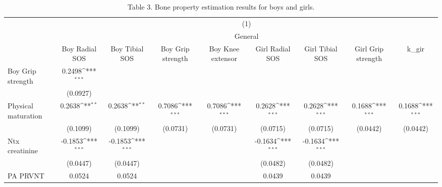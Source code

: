 \begin{table}[htbp]\centering
\def\sym#1{\ifmmode^{#1}\else\(^{#1}\)\fi}
\caption{Table 3. Bone property estimation results for boys and girls.}
\begin{tabular}{l*{8}{c}}
\hline\hline
                         &\multicolumn{8}{c}{(1)}                                                                                                                                        \\
                         &\multicolumn{8}{c}{General}                                                                                                                                    \\
                         &Boy Radial SOS         &Boy Tibial SOS         &Boy Grip strength         &Boy Knee extensor         &Girl Radial SOS         &Girl Tibial SOS         &Girl Grip strength         &     k\_gir         \\
\hline
Boy Grip strength        &    0.2498\sym{***}&                   &                   &                   &                   &                   &                   &                   \\
                         &  (0.0927)         &                   &                   &                   &                   &                   &                   &                   \\
[1em]
Physical maturation      &    0.2638\sym{**} &    0.2638\sym{**} &    0.7086\sym{***}&    0.7086\sym{***}&    0.2628\sym{***}&    0.2628\sym{***}&    0.1688\sym{***}&    0.1688\sym{***}\\
                         &  (0.1099)         &  (0.1099)         &  (0.0731)         &  (0.0731)         &  (0.0715)         &  (0.0715)         &  (0.0442)         &  (0.0442)         \\
[1em]
Ntx creatinine           &   -0.1853\sym{***}&   -0.1853\sym{***}&                   &                   &   -0.1634\sym{***}&   -0.1634\sym{***}&                   &                   \\
                         &  (0.0447)         &  (0.0447)         &                   &                   &  (0.0482)         &  (0.0482)         &                   &                   \\
[1em]
PA PRVNT                 &    0.0524         &    0.0524         &                   &                   &    0.0439         &    0.0439         &                   &                   \\

\end{tabular}
\end{table}
